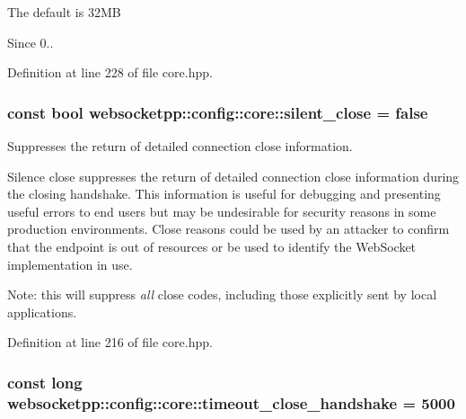 The default is 32\+M\+B

\begin{DoxySince}{Since}
0.. 
\end{DoxySince}


Definition at line 228 of file core.\+hpp.

\hypertarget{structwebsocketpp_1_1config_1_1core_acb5ef1d40ae50ab2443837270d715f53}{}
\subsubsection[{silent\+\_\+close}]{\setlength{\rightskip}{0pt plus 5cm}const bool websocketpp\+::config\+::core\+::silent\+\_\+close = false\hspace{0.3cm}{\ttfamily [static]}}\label{structwebsocketpp_1_1config_1_1core_acb5ef1d40ae50ab2443837270d715f53}


Suppresses the return of detailed connection close information. 

Silence close suppresses the return of detailed connection close information during the closing handshake. This information is useful for debugging and presenting useful errors to end users but may be undesirable for security reasons in some production environments. Close reasons could be used by an attacker to confirm that the endpoint is out of resources or be used to identify the Web\+Socket implementation in use.

Note\+: this will suppress {\itshape all} close codes, including those explicitly sent by local applications. 

Definition at line 216 of file core.\+hpp.

\hypertarget{structwebsocketpp_1_1config_1_1core_aa1a2e4285f1521817e374c4135660020}{}
\subsubsection[{timeout\+\_\+close\+\_\+handshake}]{\setlength{\rightskip}{0pt plus 5cm}const long websocketpp\+::config\+::core\+::timeout\+\_\+close\+\_\+handshake = 5000\hspace{0.3cm}{\ttfamily [static]}}\label{structwebsocketpp_1_1config_1_1core_aa1a2e4285f1521817e374c4135660020}


